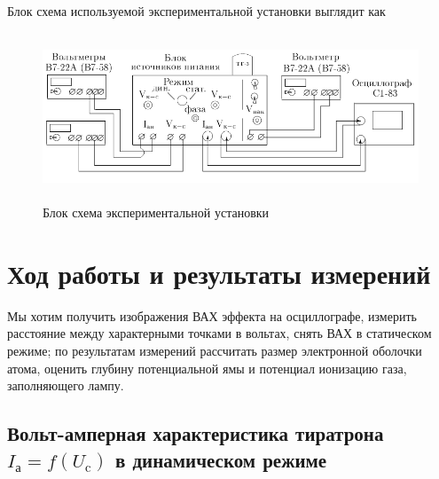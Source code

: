 \documentclass[12pt]{article}
\begin{document}
	Блок схема используемой экспериментальной установки выглядит как
\begin{figure}[h!]
	\centering
	\includegraphics[width = 12cm, height = 5cm]{image6.png}
	\caption{Блок схема экспериментальной установки}
\end{figure}

\section*{Ход работы и результаты измерений}
\par
	Мы хотим получить изображения ВАХ эффекта на осциллографе, измерить расстояние между характерными точками в вольтах, снять ВАХ в статическом режиме; по результатам измерений рассчитать размер электронной оболочки атома, оценить глубину потенциальной ямы и потенциал ионизацию газа, заполняющего лампу.

\subsection*{Вольт-амперная характеристика тиратрона $I_\text{а} = f(U_\text{c})$ в динамическом режиме}
\end{document}
